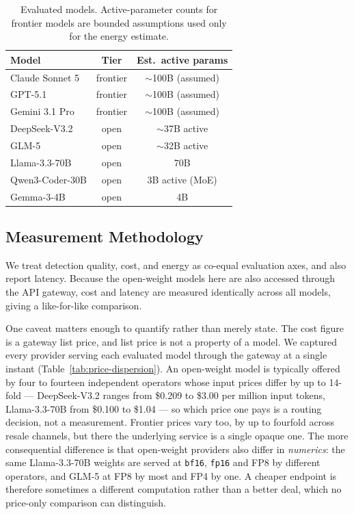 \documentclass[computers,article,submit,moreauthors]{Definitions/mdpi}
\begin{document}
\begin{table}[H]
\caption{Evaluated models. Active-parameter counts for frontier models are bounded assumptions used only for the energy estimate.\label{tab:models}}
\begin{tabularx}{\textwidth}{lCC}
\toprule
\textbf{Model} & \textbf{Tier} & \textbf{Est.\ active params}\\
\midrule
Claude Sonnet 5 & frontier & $\sim$100B (assumed)\\
GPT-5.1 & frontier & $\sim$100B (assumed)\\
Gemini 3.1 Pro & frontier & $\sim$100B (assumed)\\
DeepSeek-V3.2 & open & $\sim$37B active\\
GLM-5 & open & $\sim$32B active\\
Llama-3.3-70B & open & 70B\\
Qwen3-Coder-30B & open & 3B active (MoE)\\
Gemma-3-4B & open & 4B\\
\bottomrule
\end{tabularx}
\end{table}

\subsection{Measurement Methodology}
We treat detection quality, cost, and energy as co-equal evaluation axes, and also report latency. Because the open-weight models here are also accessed through the API gateway, cost and latency are measured identically across all models, giving a like-for-like comparison.

One caveat matters enough to quantify rather than merely state. The cost figure is a gateway list price, and list price is not a property of a model. We captured every provider serving each evaluated model through the gateway at a single instant (Table~\ref{tab:price-dispersion}). An open-weight model is typically offered by four to fourteen independent operators whose input prices differ by up to 14-fold --- DeepSeek-V3.2 ranges from \$0.209 to \$3.00 per million input tokens, Llama-3.3-70B from \$0.100 to \$1.04 --- so which price one pays is a routing decision, not a measurement. Frontier prices vary too, by up to fourfold across resale channels, but there the underlying service is a single opaque one. The more consequential difference is that open-weight providers also differ in \emph{numerics}: the same Llama-3.3-70B weights are served at \texttt{bf16}, \texttt{fp16} and FP8 by different operators, and GLM-5 at FP8 by most and FP4 by one. A cheaper endpoint is therefore sometimes a different computation rather than a better deal, which no price-only comparison can distinguish.
\end{document}
